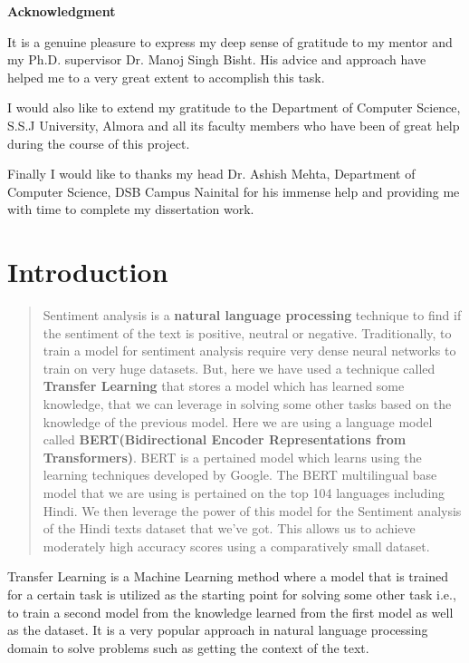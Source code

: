 \documentclass[a4paper, 12pt]{article}
\begin{document}
\begin{sloppypar}
\begin{center}
\textbf{Acknowledgment}
\end{center}
It is a genuine pleasure to express my deep sense of gratitude to my mentor and my Ph.D. supervisor Dr. Manoj Singh Bisht. His advice and approach have helped me to a very great extent to accomplish this task. 

I would also like to extend my gratitude to the Department of Computer Science, S.S.J University, Almora and all its faculty members who have been of great help during the course of this project.

Finally I would like to thanks my head Dr. Ashish Mehta, Department of Computer Science, DSB Campus Nainital for his immense help and providing me with time to complete my dissertation work.
\thispagestyle{empty}
\clearpage

\tableofcontents
\thispagestyle{empty}
\clearpage
\setcounter{page}{1}
\section{Introduction}
\begin{abstract}
\noindent Sentiment analysis is a \textbf{natural language processing} technique to find if the sentiment of the text is positive, neutral or negative. Traditionally, to train a model for sentiment analysis require very dense neural networks to train on very huge datasets. But, here we have used a technique called \textbf{Transfer Learning} that stores a model which has learned some knowledge, that we can leverage in solving some other tasks based on the knowledge of the previous model. Here we are using a language model called  \textbf{BERT(Bidirectional Encoder Representations from Transformers)}. BERT is a pertained model which learns using the learning techniques developed by Google. The BERT multilingual base model that we are using is pertained on the top 104 languages including Hindi. We then leverage the power of this model for the Sentiment analysis of the Hindi texts dataset that we've got. This allows us to achieve moderately high accuracy scores using a comparatively small dataset.
\end{abstract}

Transfer Learning is a Machine Learning method where a model that is trained for a certain task is utilized as the starting point for solving some other task i.e., to train a second model from the knowledge learned from the first model as well as the dataset. It is a very popular approach in natural language processing domain to solve problems such as getting the context of the text.


\end{sloppypar}
\end{document}
